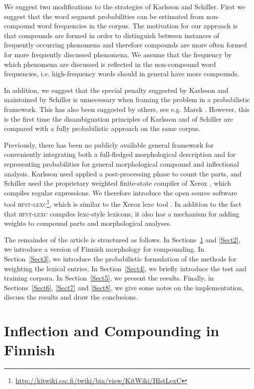 \documentclass[postprint]{flammie}
\begin{document}
We suggest two modifications to the strategies of Karlsson and
Schiller. First we suggest that the word segment probabilities can be
estimated from non-compound word frequencies in the corpus. The
motivation for our approach is that compounds are formed in order to
distinguish between instances of frequently occurring phenomena and
therefore compounds are more often formed for more frequently
discussed phenomena. We assume that the frequency by which phenomena
are discussed is reflected in the non-compound word frequencies,
i.e. high-frequency words should in general have more compounds.

In addition, we suggest that the special penalty suggested by Karlsson
and maintained by Schiller is unnecessary when framing the problem in
a probabilistic framework. This has also been suggested by others, see
e.g. Marek \cite{marek/2006}. However, this is the first time the
disambiguation principles of Karlsson and of Schiller are compared
with a fully probabilistic approach on the same corpus.

Previously, there has been no publicly available general framework for
conveniently integrating both a full-fledged morphological description
and for representing probabilities for general morphological compound
and inflectional analysis. Karlsson \cite{karlsson/1992} used
applied a post-processing phase to count the parts, and Schiller
\cite{schiller/2005} used the proprietary weighted finite-state compiler
of Xerox \cite{kempe/2003}, which compiles regular expressions. We
therefore introduce the open source software tool
\textsc{hfst-lexc}\footnote{\url{http://kitwiki.csc.fi/twiki/bin/view/KitWiki/HfstLexC}},
which is similar to the Xerox lexc tool \cite{beesley/2003}. In
addition to the fact that \textsc{hfst-lexc} compiles lexc-style
lexicons, it also has a mechanism for adding weights to compound parts
and morphological analyses.

The remainder of the article is structured as follows. In
Sections~\ref{Sect1} and \ref{Sect2}, we introduce a version of
Finnish morphology for compounding. In Section~\ref{Sect3}, we
introduce the probabilistic formulation of the methods for weighting
the lexical entries. In Section~\ref{Sect4}, we briefly introduce the
test and training corpora. In Section~\ref{Sect5}, we present the
results. Finally, in Sections~\ref{Sect6}, \ref{Sect7} and
\ref{Sect8}, we give some notes on the implementation, discuss the
results and draw the conclusions.

\section{Inflection and Compounding in Finnish}
\label{Sect1}
\end{document}
